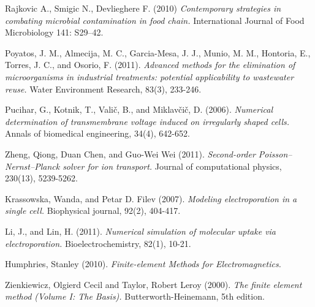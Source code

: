 \begin{thebibliography}{99}
	Rajkovic A., Smigic N., Devlieghere F. (2010) \emph{Contemporary strategies in combating microbial contamination in food chain.}  International Journal of Food Microbiology 141: S29–42.
	
	Poyatos, J. M., Almecija, M. C., Garcia-Mesa, J. J., Munio, M. M., Hontoria, E., Torres, J. C., and Osorio, F. (2011). \emph{Advanced methods for the elimination of microorganisms in industrial treatments: potential applicability to wastewater reuse.} Water Environment Research, 83(3), 233-246.	

	Pucihar, G., Kotnik, T., Valič, B., and Miklavčič, D. (2006). \emph{Numerical determination of transmembrane voltage induced on irregularly shaped cells.} Annals of biomedical engineering, 34(4), 642-652.

	Zheng, Qiong, Duan Chen, and Guo-Wei Wei (2011). \emph{Second-order Poisson–Nernst–Planck solver for ion transport.} Journal of computational physics, 230(13), 5239-5262.

	Krassowska, Wanda, and Petar D. Filev (2007). \emph{Modeling electroporation in a single cell.} Biophysical journal, 92(2), 404-417.

	Li, J., and Lin, H. (2011). \emph{Numerical simulation of molecular uptake via electroporation.} Bioelectrochemistry, 82(1), 10-21.

	Humphries, Stanley (2010). \emph{Finite-element Methods for Electromagnetics.}

	Zienkiewicz, Olgierd Cecil and Taylor, Robert Leroy (2000). \emph{The finite element method (Volume I: The Basis).} Butterworth-Heinemann, 5th edition.
	

\end{thebibliography}
